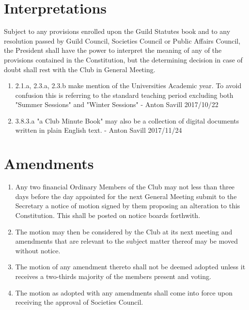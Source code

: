 \documentclass[10pt,a4paper]{report}
\begin{document}
	\section{Interpretations}
		Subject to any provisions enrolled upon the Guild Statutes book and to any resolution passed by Guild Council, Societies Council or Public Affairs Council, the President shall have the power to interpret the meaning of any of the provisions contained in the Constitution, but the determining decision in case of doubt shall rest with the Club in General Meeting.
		\begin{enumerate}[label=\arabic*]
			\item 2.1.a, 2.3.a, 2.3.b make mention of the Universities Academic year. To avoid confusion this is referring to the standard teaching period excluding both "Summer Sessions" and "Winter Sessions" - Anton Savill 2017/10/22
			\item 3.8.3.a "a Club Minute Book" may also be a collection of digital documents written in plain English text. - Anton Savill  2017/11/24  
		\end{enumerate}
	
	\section{Amendments}
		\begin{enumerate}[label=\alph*]
			\item Any two financial Ordinary Members of the Club may not less than three days before the day appointed for the next General Meeting submit to the Secretary a notice of motion signed by them proposing an alteration to this Constitution. This shall be posted on notice boards forthwith.
			\item The motion may then be considered by the Club at its next meeting and amendments that are relevant to the subject matter thereof may be moved without notice.
			\item The motion of any amendment thereto shall not be deemed adopted unless it receives a two-thirds majority of the members present and voting.
			\item The motion as adopted with any amendments shall come into force upon receiving the approval of Societies Council.
		\end{enumerate}
		
	
\end{document}
